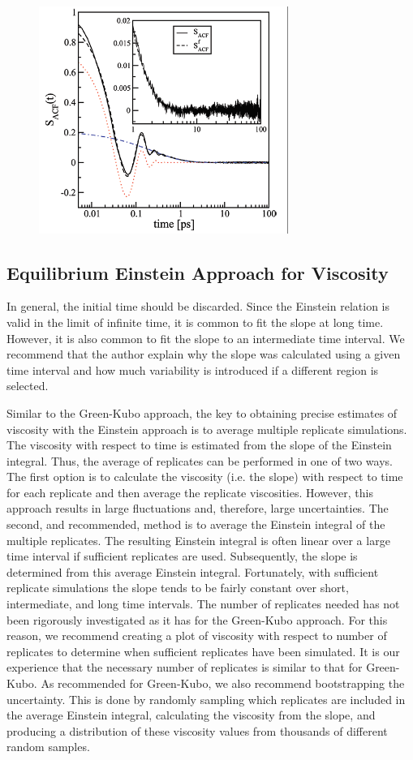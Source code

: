 \documentclass[9pt]{livecoms}
\begin{document}
\begin{figure}[htb!]
	\centering
	\includegraphics[width=3.2in]{figures/FanourgakisFig1.png}
	\caption{}
	\label{fig:FanourgakisFig1}
\end{figure}

\subsection{Equilibrium Einstein Approach for Viscosity}

In general, the initial time should be discarded. Since the Einstein relation is valid in the limit of infinite time, it is common to fit the slope at long time. However, it is also common to fit the slope to an intermediate time interval. We recommend that the author explain why the slope was calculated using a given time interval and how much variability is introduced if a different region is selected.

Similar to the Green-Kubo approach, the key to obtaining precise estimates of viscosity with the Einstein approach is to average multiple replicate simulations. The viscosity with respect to time is estimated from the slope of the Einstein integral. Thus, the average of replicates can be performed in one of two ways. The first option is to calculate the viscosity (i.e. the slope) with respect to time for each replicate and then average the replicate viscosities. However, this approach results in large fluctuations and, therefore, large uncertainties. The second, and recommended, method is to average the Einstein integral of the multiple replicates. The resulting Einstein integral is often linear over a large time interval if sufficient replicates are used. Subsequently, the slope is determined from this average Einstein integral. Fortunately, with sufficient replicate simulations the slope tends to be fairly constant over short, intermediate, and long time intervals. The number of replicates needed has not been rigorously investigated as it has for the Green-Kubo approach. For this reason, we recommend creating a plot of viscosity with respect to number of replicates to determine when sufficient replicates have been simulated. It is our experience that the necessary number of replicates is similar to that for Green-Kubo. As recommended for Green-Kubo, we also recommend bootstrapping the uncertainty. This is done by randomly sampling which replicates are included in the average Einstein integral, calculating the viscosity from the slope, and producing a distribution of these viscosity values from thousands of different random samples.
\end{document}
